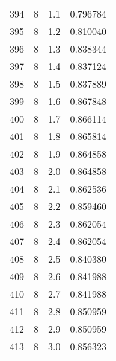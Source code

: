 \begin{tabular}{lrrr}
394 &        8 &      1.1 &  0.796784 \\
395 &        8 &      1.2 &  0.810040 \\
396 &        8 &      1.3 &  0.838344 \\
397 &        8 &      1.4 &  0.837124 \\
398 &        8 &      1.5 &  0.837889 \\
399 &        8 &      1.6 &  0.867848 \\
400 &        8 &      1.7 &  0.866114 \\
401 &        8 &      1.8 &  0.865814 \\
402 &        8 &      1.9 &  0.864858 \\
403 &        8 &      2.0 &  0.864858 \\
404 &        8 &      2.1 &  0.862536 \\
405 &        8 &      2.2 &  0.859460 \\
406 &        8 &      2.3 &  0.862054 \\
407 &        8 &      2.4 &  0.862054 \\
408 &        8 &      2.5 &  0.840380 \\
409 &        8 &      2.6 &  0.841988 \\
410 &        8 &      2.7 &  0.841988 \\
411 &        8 &      2.8 &  0.850959 \\
412 &        8 &      2.9 &  0.850959 \\
413 &        8 &      3.0 &  0.856323 \\
\bottomrule
\end{tabular}

